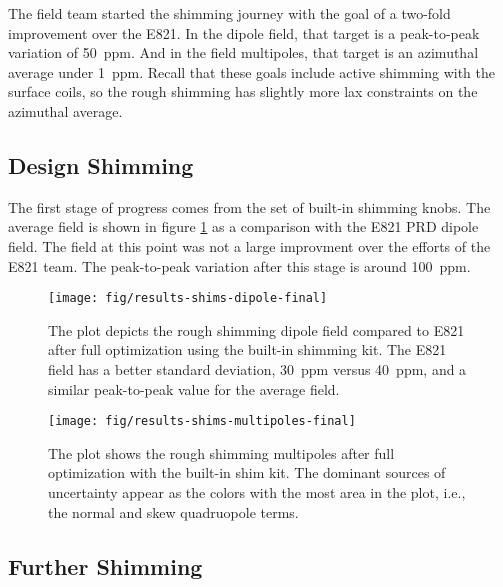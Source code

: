 The field team started the shimming journey with the goal of a two-fold improvement over the E821.  In the dipole field, that target is a peak-to-peak variation of \SI{50}{ppm}. And in the field multipoles, that target is an azimuthal average under \SI{1}{ppm}.  Recall that these goals include active shimming with the surface coils, so the rough shimming has slightly more lax constraints on the azimuthal average.

\subsection{Design Shimming}

The first stage of progress comes from the set of built-in shimming knobs.  The average field is shown in figure \ref{fig:results-shims-dipole-final} as a comparison with the E821 PRD dipole field.  The field at this point was not a large improvment over the efforts of the E821 team.  The peak-to-peak variation after this stage is around \SI{100}{ppm}.

\begin{figure}
\centering
\texttt{[image: fig/results-shims-dipole-final]}
\caption{
    The plot depicts the rough shimming dipole field compared to E821 after full optimization using the built-in shimming kit.  The E821 field has a better standard deviation, \SI{30}{ppm} versus \SI{40}{ppm}, and a similar peak-to-peak value for the average field. 
    \label{fig:results-shims-dipole-final}
}
\end{figure}

\begin{figure}
\centering
\texttt{[image: fig/results-shims-multipoles-final]}
\caption{
    The plot shows the rough shimming multipoles after full optimization with the built-in shim kit.  The dominant sources of uncertainty appear as the colors with the most area in the plot, i.e., the normal and skew quadruopole terms. 
    \label{fig:results-shims-multipoles-final}
}
\end{figure}

\subsection{Further Shimming}

